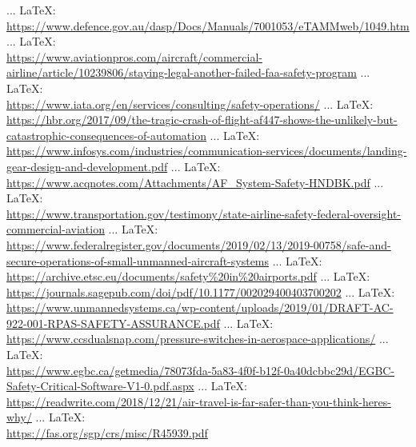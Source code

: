 \begin{thebibliography}{99}
{{ ... \LaTeX:\\ \url{https://www.defence.gov.au/dasp/Docs/Manuals/7001053/eTAMMweb/1049.htm}
 ... \LaTeX:\\ \url{https://www.aviationpros.com/aircraft/commercial-airline/article/10239806/staying-legal-another-failed-faa-safety-program}
 ... \LaTeX:\\ \url{https://www.iata.org/en/services/consulting/safety-operations/}
 ... \LaTeX:\\ \url{https://hbr.org/2017/09/the-tragic-crash-of-flight-af447-shows-the-unlikely-but-catastrophic-consequences-of-automation}
 ... \LaTeX:\\ \url{https://www.infosys.com/industries/communication-services/documents/landing-gear-design-and-development.pdf}
 ... \LaTeX:\\ \url{https://www.acqnotes.com/Attachments/AF_System-Safety-HNDBK.pdf}
 ... \LaTeX:\\ \url{https://www.transportation.gov/testimony/state-airline-safety-federal-oversight-commercial-aviation}
 ... \LaTeX:\\ \url{https://www.federalregister.gov/documents/2019/02/13/2019-00758/safe-and-secure-operations-of-small-unmanned-aircraft-systems}
 ... \LaTeX:\\ \url{https://archive.etsc.eu/documents/safety%20in%20airports.pdf}
 ... \LaTeX:\\ \url{https://journals.sagepub.com/doi/pdf/10.1177/002029400403700202}
 ... \LaTeX:\\ \url{https://www.unmannedsystems.ca/wp-content/uploads/2019/01/DRAFT-AC-922-001-RPAS-SAFETY-ASSURANCE.pdf}
 ... \LaTeX:\\ \url{https://www.ccsdualsnap.com/pressure-switches-in-aerospace-applications/}
 ... \LaTeX:\\ \url{https://www.egbc.ca/getmedia/78073fda-5a83-4f0f-b12f-0a40dcbbc29d/EGBC-Safety-Critical-Software-V1-0.pdf.aspx}
 ... \LaTeX:\\ \url{https://readwrite.com/2018/12/21/air-travel-is-far-safer-than-you-think-heres-why/}
 ... \LaTeX:\\ \url{https://fas.org/sgp/crs/misc/R45939.pdf}
}}
\end{thebibliography}
